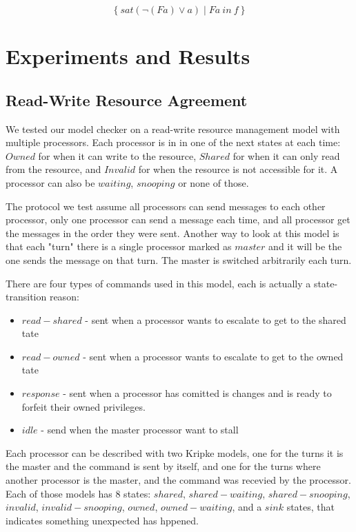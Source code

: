 \documentclass[11pt]{article}
\begin{document}
    \[        
        \left\{sat(\neg(Fa)\vee a) \;|\; Fa\ in\ f \right\}
    \]


\section{Experiments and Results}
    \subsection{Read-Write Resource Agreement}
        We tested our model checker on a read-write resource management model with multiple processors.
        Each processor is in in one of the next states at each time: $Owned$ for when it can write to the
        resource, $Shared$ for when it can only read from the resource, and $Invalid$ for when the resource
        is not accessible for it. A processor can also be $waiting$, $snooping$ or none of those.

        The protocol we test assume all processors can send messages to each other processor, only one
        processor can send a message each time, and all processor get the messages in the order they were sent.
        Another way to look at this model is that each "turn" there is a single processor marked as $master$ 
        and it will be the one sends the message on that turn. The master is switched arbitrarily each turn.

        There are four types of commands used in this model, each is actually a state-transition reason:
        \begin{itemize}
            \item
                $read-shared$ - sent when a processor wants to escalate to get to the shared tate
            \item
                $read-owned$ - sent when a processor wants to escalate to get to the owned tate
            \item
                $response$ - sent when a processor has comitted is changes and is ready to forfeit
                their owned privileges.
            \item 
                $idle$ - send when the master processor want to stall
        \end{itemize}

        Each processor can be described with two Kripke models, one for the turns it 
        is the master and the command is sent by itself, and one for the turns where another 
        processor is the master, and the command was recevied by the processor.
        Each of those models has 8 states: $shared$, $shared-waiting$, $shared-snooping$,
        $invalid$, $invalid-snooping$, $owned$, $owned-waiting$, and a $sink$ states, that indicates something 
        unexpected has hppened. 
\end{document}
